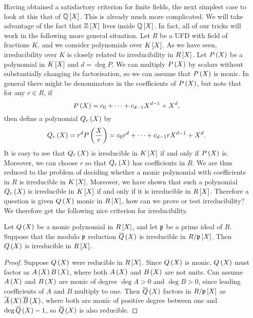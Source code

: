 Having obtained a satisfactory criterion for finite fields, the next simplest case to look at this that of $ \QQ\sbr{X} $. This is already much more complicated. We will take advantage of the fact that $ \ZZ\sbr{X} $ lives inside $ \QQ\sbr{X} $. In fact, all of our tricks will work in the following more general situation. Let $ R $ be a UFD with field of fractions $ K $, and we consider polynomials over $ K\sbr{X} $. As we have seen, irreducibility over $ K $ is closely related to irreducibility in $ R\sbr{X} $. Let $ P\br{X} $ be a polynomial in $ K\sbr{X} $ and $ d = \deg P $. We can multiply $ P\br{X} $ by scalars without substantially changing its factorisation, so we can assume that $ P\br{X} $ is monic. In general there might be denominators in the coefficients of $ P\br{X} $, but note that for any $ r \in R $, if
$$ P\br{X} = c_0 + \dots + c_{d - 1}X^{d - 1} + X^d, $$
then define a polynomial $ Q_r\br{X} $ by
$$ Q_r\br{X} = r^dP\br{\dfrac{X}{r}} = c_0r^d + \dots + c_{d - 1}rX^{d - 1} + X^d. $$
It is easy to see that $ Q_r\br{X} $ is irreducible in $ K\sbr{X} $ if and only if $ P\br{X} $ is. Moreover, we can choose $ r $ so that $ Q_r\br{X} $ has coefficients in $ R $. We are thus reduced to the problem of deciding whether a monic polynomial with coefficients in $ R $ is irreducible in $ K\sbr{X} $. Moreover, we have shown that such a polynomial $ Q_r\br{X} $ is irreducible in $ K\sbr{X} $ if and only if it is irreducible in $ R\sbr{X} $. Therefore a question is given $ Q\br{X} $ monic in $ R\sbr{X} $, how can we prove or test irreducibility? We therefore get the following nice criterion for irreducibility.

\begin{proposition}
Let $ Q\br{X} $ be a monic polynomial in $ R\sbr{X} $, and let $ \mathfrak{p} $ be a prime ideal of $ R $. Suppose that the modulo $ \mathfrak{p} $ reduction $ \overline{Q}\br{X} $ is irreducible in $ R / \ppp\sbr{X} $. Then $ Q\br{X} $ is irreducible in $ R\sbr{X} $.
\end{proposition}

\begin{proof}
Suppose $ Q\br{X} $ were reducible in $ R\sbr{X} $. Since $ Q\br{X} $ is monic, $ Q\br{X} $ must factor as $ A\br{X}B\br{X} $, where both $ A\br{X} $ and $ B\br{X} $ are not units. Can assume $ A\br{X} $ and $ B\br{X} $ are monic of degree $ \deg A > 0 $ and $ \deg B > 0 $, since leading coefficients of $ A $ and $ B $ multiply to one. Then $ \overline{Q}\br{X} $ factors in $ R / \ppp\sbr{X} $ as $ \overline{A}\br{X}\overline{B}\br{X} $, where both are monic of positive degree between one and $ \deg \overline{Q}\br{X} - 1 $, so $ \overline{Q}\br{X} $ is also reducible.
\end{proof}

